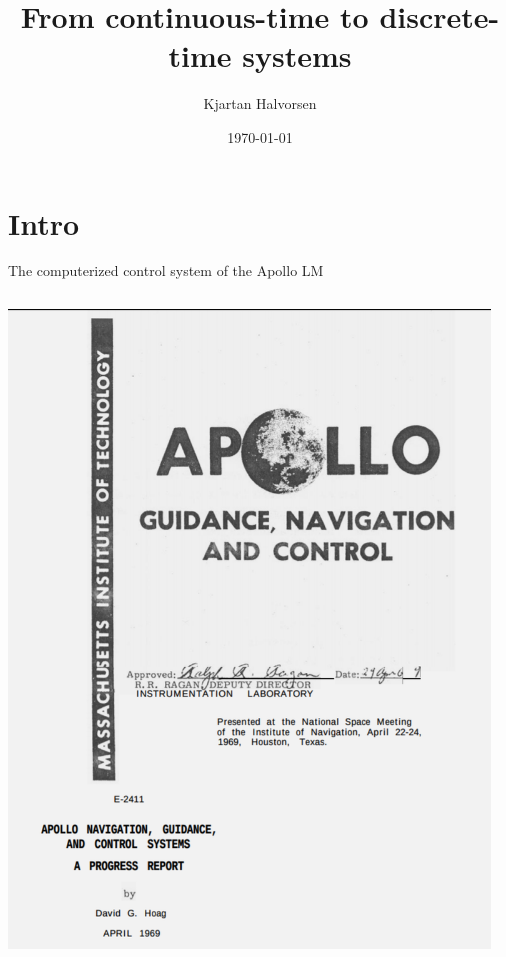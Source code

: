 \documentclass[presentation,aspectratio=169]{beamer}
\author{Kjartan Halvorsen}
\date{\today}
\title{From continuous-time to discrete-time systems}
\begin{document}
\maketitle

\section{Intro}
\label{sec:org50e75ca}

\begin{frame}[label={sec:orgb5d68d5}]{The computerized control system of the Apollo LM}
\begin{columns}
\begin{column}{0.3\columnwidth}
\begin{center}
 \includegraphics[width=1.0\linewidth]{../../figures/Hoag-report-1.png}
\end{center}
\end{column}
\begin{column}{0.7\columnwidth}
\pause


\end{column}
\end{columns}
\end{frame}
\end{document}
